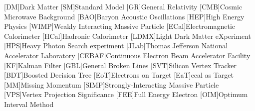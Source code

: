 
\usepackage{silence} %

\usepackage{epsfig} %
\usepackage{epic} %
\usepackage{eepic} %
\usepackage{url} %
\usepackage{longtable} %
\usepackage{mathrsfs} %
\usepackage{multirow} %
\usepackage{bigstrut} %
\usepackage{amssymb} %
\usepackage{graphicx} %
\usepackage{setspace} %
\usepackage{xspace} %
\usepackage{amsmath} %
\usepackage{siunitx} %
\usepackage{booktabs} %
\usepackage{hyperref} %
\usepackage{subcaption}
\usepackage{graphicx} %

\usepackage[noabbrev,capitalise]{cleveref} %

\newcommand{\creflastconjunction}{, and } %

\usepackage[compat=1.1.0]{tikz-feynman} %

\usepackage{hepunits}

\newcommand{\fourgev}{\qty{4}{GeV}\xspace}
\newcommand{\eightgev}{\qty{8}{GeV}\xspace}
\newcommand{\ecal}{ECal\xspace}
\newcommand{\hcal}{HCal\xspace}

\usepackage{acronym}
[DM]{Dark Matter}
[SM]{Standard Model}
[GR]{General Relativity}
[CMB]{Cosmic Microwave Background}
[BAO]{Baryon Acoustic Oscillations}
[HEP]{High Energy Physics}
[WIMP]{Weakly Interacting Massive Particle}
[ECal]{Electromagnetic Calorimeter}
[HCal]{Hadronic Calorimeter}
[LDMX]{Light Dark Matter eXperiment}
[HPS]{Heavy Photon Search experiment}
[JLab]{Thomas Jefferson National Accelerator Laboratory}
[CEBAF]{Continuous Electron Beam Accelerator Facility}
[KF]{Kalman Filter}
[GBL]{General Broken Lines}
[SVT]{Silicon Vertex Tracker}
[BDT]{Boosted Decision Tree}
[EoT]{Electrons on Target}
[EaT]{\ac{ecal} as Target}
[MM]{Missing Momentum}
[SIMP]{Strongly-Interacting Massive Particle}
[VPS]{Vertex Projection Significance}
[FEE]{Full Energy Electron}
[OIM]{Optimum Interval Method}

